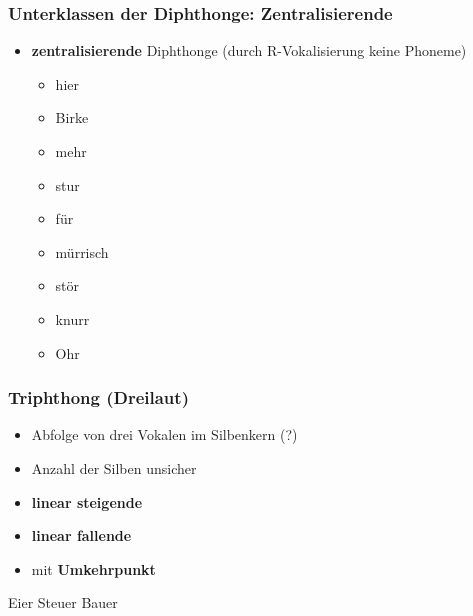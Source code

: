 \begin{frame}
\frametitle{Unterklassen der Diphthonge: Zentralisierende}

	\begin{itemize}
		\item \textbf{zentralisierende} Diphthonge (durch R-Vokalisierung \ras keine Phoneme)

		\ea 
		\begin{itemize}
			\item {} \ras hier
			\item {} \ras Birke
			\item {} \ras mehr
			\item {} \ras stur
			\item {} \ras für
			\item {} \ras mürrisch
			\item {} \ras stör
			\item {} \ras knurr
			\item {} \ras Ohr
		\end{itemize}
		\z
		
	\end{itemize}

						 		
	
\end{frame}



\begin{frame}
\frametitle{Triphthong (Dreilaut)}
	
	\begin{itemize}
		\item Abfolge von drei Vokalen im Silbenkern (?)
			\item Anzahl der Silben \ras unsicher
			\item \textbf{linear steigende}
			\item \textbf{linear fallende}
			\item mit \textbf{Umkehrpunkt}
	\end{itemize}
	
	\eal
	\ex {} \ras Eier
	\ex {} \ras Steuer
	\ex {} \ras Bauer
	\zl
	

\end{frame}

	
	
%
